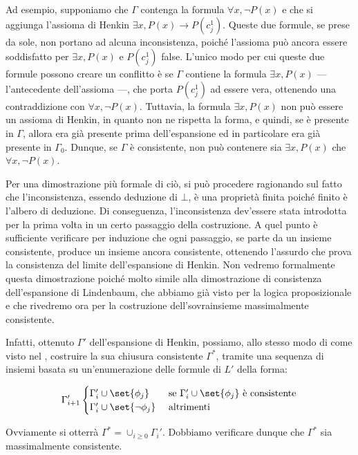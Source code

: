 Ad esempio, supponiamo che \(\Gamma\) contenga la formula \(\forall x, \neg P(x)\) e che si aggiunga l'assioma di Henkin \(\exists x, P(x) \to P(c_j^1)\). Queste due formule, se prese da sole, non portano ad alcuna inconsistenza, poiché l'assioma può ancora essere soddisfatto per \(\exists x, P(x)\) e \(P(c_j^1)\) false. L'unico modo per cui queste due formule possono creare un conflitto è se \(\Gamma\) contiene la formula \(\exists x, P(x)\) --- l'antecedente dell'assioma ---, che porta \(P(c_j^1)\) ad essere vera, ottenendo una contraddizione con \(\forall x, \neg P(x)\).
Tuttavia, la formula \(\exists x, P(x)\) non può essere un assioma di Henkin, in quanto non ne rispetta la forma, e quindi, se è presente in \(\Gamma\), allora era già presente prima dell'espansione ed in particolare era già presente in \(\Gamma_0\). Dunque, se \(\Gamma\) è consistente, non può contenere sia \(\exists x, P(x)\) che \(\forall x, \neg P(x)\).

Per una dimostrazione più formale di ciò, si può procedere ragionando sul fatto che l'inconsistenza, essendo deduzione di \(\bot\), è una proprietà finita poiché finito è l'albero di deduzione. Di conseguenza, l'inconsistenza dev'essere stata introdotta per la prima volta in un certo passaggio della costruzione. A quel punto è sufficiente verificare per induzione che ogni passaggio, se parte da un insieme consistente, produce un insieme ancora consistente, ottenendo l'assurdo che prova la consistenza del limite dell'espansione di Henkin. Non vedremo formalmente questa dimostrazione poiché molto simile alla dimostrazione di consistenza dell'espansione di Lindenbaum, che abbiamo già visto per la logica proposizionale e che rivedremo ora per la costruzione dell'sovrainsieme massimalmente consistente.

Infatti, ottenuto \(\Gamma'\) dell'espansione di Henkin, possiamo, allo stesso modo di come visto nel , costruire la sua chiusura consistente \(\Gamma^*\), tramite una sequenza di insiemi basata su un'enumerazione delle formule di \(L'\) della forma:

\[\Gamma_{i+1}' \begin{cases}
                  \Gamma_i' \cup \set{\phi_j} & \text{ se } \Gamma_i' \cup \set{\phi_j} \text{ è consistente}\\
                  \Gamma_i' \cup \set{\neg \phi_j} & \text{ altrimenti}
                \end{cases}
\]

Ovviamente si otterrà \(\Gamma^* = \cup_{i\geq 0} \Gamma_i'\). Dobbiamo verificare dunque che \(\Gamma^*\) sia massimalmente consistente.

